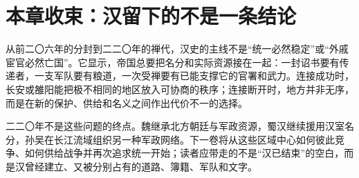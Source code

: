 \section{本章收束：汉留下的不是一条结论}

从前二〇六年的分封到二二〇年的禅代，汉史的主线不是“统一必然稳定”或“外戚宦官必然亡国”。它显示，帝国总要把名分和实际资源接在一起：一封诏书要有传递者，一支军队要有粮道，一次受禅要有已能支撑它的官署和武力。连接成功时，长安或雒阳能把极不相同的地区放入可协商的秩序；连接断开时，地方并非无序，而是在新的保护、供给和名义之间作出代价不一的选择。

二二〇年不是这些问题的终点。魏继承北方朝廷与军政资源，蜀汉继续援用汉室名分，孙吴在长江流域组织另一种军政网络。下一卷将从这些区域中心如何彼此竞争、如何供给战争并再次追求统一开始；读者应带走的不是“汉已结束”的空白，而是汉曾经建立、又被分别占有的道路、簿籍、军队和文字。
